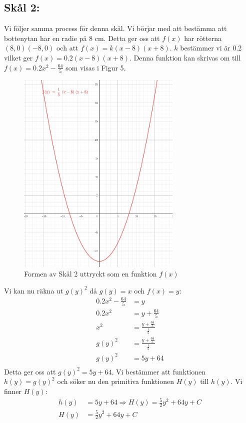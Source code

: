 \documentclass[12pt]{article}
\begin{document}
\subsection*{Skål 2:}
Vi följer samma process för denna skål. Vi börjar med att bestämma att bottenytan har en radie på 8 cm. Detta ger oss att $f(x)$ har rötterna $(8,0) (-8,0)$ och att $f(x)=k(x-8)(x+8)$. $k$ bestämmer vi är 0.2 vilket ger $f(x)=0.2(x-8)(x+8)$. Denna funktion kan skrivas om till $f(x)=0.2x^2-\frac{64}{5}$ som visas i Figur 5.
\begin{figure}[H]
    \centering
    \renewcommand{\thefigure}{5}
    \includegraphics[width=0.7\textwidth]{figur5.png}
    \caption{Formen av Skål 2 uttryckt som en funktion $f(x)$}
\end{figure}
Vi kan nu räkna ut $g{(y)}^2$ då $g(y)=x$ och $f(x)=y$:
\begin{align*}
    0.2x^2-\frac{64}{5}&=y\\
    0.2x^2&=y+\frac{64}{5}\\
    x^2&=\frac{y+\frac{64}{5}}{\frac{1}{5}}\\
    g{(y)}^2&=\frac{y+\frac{64}{5}}{\frac{1}{5}}\\
    g{(y)}^2&=5y+64\\
\end{align*}
Detta ger oss att $g{(y)}^2=5y+64$.
Vi bestämmer att funktionen $h(y)=g{(y)}^2$ och söker nu den primitiva funktionen $H(y)$ till $h(y)$. Vi finner $H(y)$:
\begin{align*}
    h(y)&=5y+64 \Rightarrow H(y)=\frac{5}{2}y^2+64y+C\\
    H(y)&=\frac{5}{2}y^2+64y+C\\
\end{align*}
\end{document}
